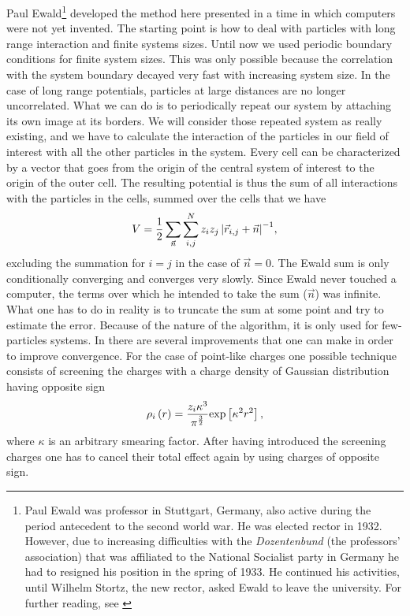 Paul Ewald\footnote{Paul Ewald was professor in Stuttgart, Germany, also active during the period antecedent to the second world war. He was elected rector in 1932. However, due to increasing difficulties with the \emph{Dozentenbund} (the professors' association) that was affiliated to the National Socialist party in Germany he had to resigned his position in the spring of 1933. He continued his activities, until Wilhelm Stortz, the new rector, asked Ewald to leave the university. For further reading, see \citet{ewald_interview}} developed the method here presented in a time in which computers were not yet invented. The starting point is how to deal with particles with long range interaction and finite systems sizes. Until now we used periodic boundary conditions for finite system sizes. This was only possible because the correlation with the system boundary decayed very fast with increasing system size. In the case of long range potentials, particles at large distances are no longer uncorrelated. What we can do is to periodically repeat our system by attaching its own image at its borders. We will consider those repeated system as really existing, and we have to calculate the interaction of the particles in our field of interest with all the other particles in the system. Every cell can be characterized by a vector that goes from the origin of the central system of interest to the origin of the outer cell. The resulting potential is thus the sum of all interactions with the particles in the cells, summed over the cells that we have
\begin{equation}
V= \frac{1}{2} \sum _{\vec{n}} {     \sum_{i,j}^N {z_i z_j \left|\vec{r}_{i,j} + \vec{n}\right|^{-1}}    },
\label{eq:ewald}
\end{equation} 
excluding the summation for  $i=j$ in the case of $\vec{n} = 0$. The Ewald sum is only conditionally converging and converges very slowly. Since Ewald never touched a computer, the terms over which he intended to take the sum ($\vec{n}$) was infinite. What one has to do in reality is to truncate the sum at some point and try to estimate the error. Because of the nature of the algorithm, it is only used for few-particles systems. In \citet{dixon} there are several improvements that one can make in order to improve convergence. For the case of point-like charges one possible technique consists of screening the charges with a charge density of Gaussian distribution having opposite sign
$$
\rho_i\left(r\right) = \frac{z_i \kappa^3}{\pi^{\frac{3}{2}}} \text{exp}\left[\kappa^2r^2\right],
$$ 
where $\kappa$ is an arbitrary smearing factor.
After having introduced the screening charges one has to cancel their total effect again by using charges of opposite sign.


